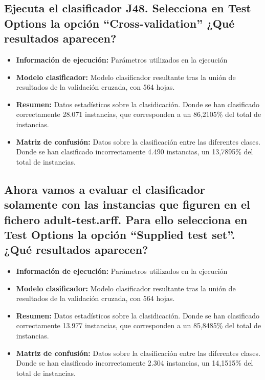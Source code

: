 \documentclass[10pt, spanish, pdftex]{../.memo/plantilla_memorias}
\begin{document}
{\subsection{Ejecuta el clasificador J48. Selecciona en Test Options la opción “Cross-validation” ¿Qué resultados aparecen?}
\begin{itemize}
	\item \textbf{Información de ejecución:} Parámetros utilizados en la ejecución
	\item \textbf{Modelo clasificador:} Modelo clasificador resultante tras la unión de resultados de la validación cruzada, con 564 hojas.
	\item \textbf{Resumen: } Datos estadísticos sobre la clasidicación. Donde se han clasificado correctamente 28.071 instancias, que corresponden a un 86,2105\% del total de instancias.
	\item \textbf{Matriz de confusión: } Datos sobre la clasificación entre las diferentes clases. Donde se han clasificado incorrectamente 4.490 instancias, un 13,7895\% del total de instancias.
\end{itemize}

\subsection{Ahora vamos a evaluar el clasificador solamente con las instancias que figuren en el fichero adult-test.arff.
Para ello selecciona en Test Options la opción “Supplied test set”. ¿Qué resultados aparecen?}
\begin{itemize}
	\item \textbf{Información de ejecución:} Parámetros utilizados en la ejecución
	\item \textbf{Modelo clasificador:} Modelo clasificador resultante tras la unión de resultados de la validación cruzada, con 564 hojas.
	\item \textbf{Resumen: } Datos estadísticos sobre la clasidicación. Donde se han clasificado correctamente 13.977 instancias, que corresponden a un 85,8485\% del total de instancias.
	\item \textbf{Matriz de confusión: } Datos sobre la clasificación entre las diferentes clases. Donde se han clasificado incorrectamente 2.304 instancias, un 14,1515\% del total de instancias.
\end{itemize}

}
\end{document}

